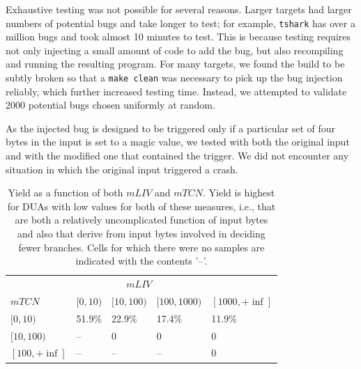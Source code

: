 Exhaustive testing was not possible for several reasons.
Larger targets had larger numbers of potential bugs and take longer to test; for example, \verb+tshark+ has over a million bugs and took almost 10 minutes to test.
This is because testing requires not only injecting a small amount of code to add the bug, but also recompiling and running the resulting program.
For many targets, we found the build to be subtly broken so that a \verb+make clean+ was necessary to pick up the bug injection reliably, which further increased testing time.
Instead, we attempted to validate 2000 potential bugs chosen uniformly at random.

As the injected bug is designed to be triggered only if a particular set of four bytes in the input is set to a magic value, we tested with both the original input and with the modified one that contained the trigger. 
We did not encounter any situation in which the original input triggered a crash.

\begin{table}[b]
\centering
\begin{tabular}{l|l|l|l|l} 
       & \multicolumn{3}{c}{$mLIV$} &  \\  
$mTCN$ &         $[0,10)$ & $[10,100)$ & $[100,1000)$ & $[1000,+\inf]$ \\  \hline 
$[0,10)$ &       51.9\%   & 22.9\%     & 17.4\%       & 11.9\%          \\
$[10,100)$ &     --       & 0          & 0            & 0     \\
$[100,+\inf]$ &  --       & --         & --           & 0     \\ 
\end{tabular}
\caption{Yield as a function of both $mLIV$ and $mTCN$.  
Yield is highest for DUAs with low values for both of these measures, i.e., that are both a relatively uncomplicated function of input bytes and also that derive from input bytes involved in deciding fewer branches.
Cells for which there were no samples are indicated with the contents '--'.}
\label{table:yield-breakdown}
\end{table}

